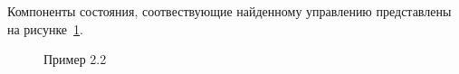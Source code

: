 \documentclass[12pt]{article}
\begin{document}
    Компоненты состояния, соотвествующие найденному управлению представлены на рисунке~\ref{img_end_state}.
    \begin{figure}[H]
        \centering
        \caption{Пример 2.2}
        \label{img_end_state}
    \end{figure}
\end{document}
